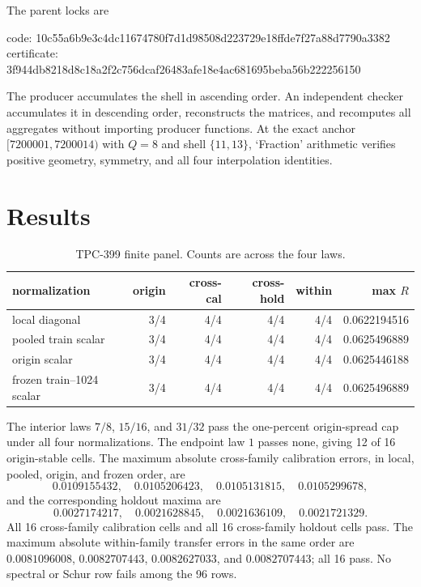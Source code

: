\documentclass[10pt]{article}
\begin{document}
The parent locks are
\begin{center}
\small\ttfamily
code: 10c55a6b9e3c4dc11674780f7d1d98508d223729e18ffde7f27a88d7790a3382\\
certificate: 3f944db8218d8c18a2f2c756dcaf26483afe18e4ac681695beba56b222256150
\end{center}

The producer accumulates the shell in ascending order.  An independent
checker accumulates it in descending order, reconstructs the matrices, and
recomputes all aggregates without importing producer functions.  At the exact
anchor $[7200001,7200014)$ with $Q=8$ and shell $\{11,13\}$, `Fraction'
arithmetic verifies positive geometry, symmetry, and all four interpolation
identities.

\section{Results}

\begin{table}[t]
\centering
\caption{TPC-399 finite panel.  Counts are across the four laws.}
\label{tab:summary}
\small
\begin{tabular}{@{}lrrrrr@{}}
\toprule
normalization & origin & cross-cal & cross-hold & within & max $R$\\
\midrule
local diagonal & 3/4 & 4/4 & 4/4 & 4/4 & 0.0622194516\\
pooled train scalar & 3/4 & 4/4 & 4/4 & 4/4 & 0.0625496889\\
origin scalar & 3/4 & 4/4 & 4/4 & 4/4 & 0.0625446188\\
frozen train--1024 scalar & 3/4 & 4/4 & 4/4 & 4/4 & 0.0625496889\\
\bottomrule
\end{tabular}
\end{table}

The interior laws $7/8$, $15/16$, and $31/32$ pass the one-percent
origin-spread cap under all four normalizations.  The endpoint law $1$ passes
none, giving 12 of 16 origin-stable cells.  The maximum absolute cross-family
calibration errors, in local, pooled, origin, and frozen order, are
\[
0.0109155432,\quad 0.0105206423,\quad
0.0105131815,\quad 0.0105299678,
\]
and the corresponding holdout maxima are
\[
0.0027174217,\quad 0.0021628845,\quad
0.0021636109,\quad 0.0021721329.
\]
All 16 cross-family calibration cells and all 16 cross-family holdout cells
pass.  The maximum absolute within-family transfer errors in the same order
are $0.0081096008$, $0.0082707443$, $0.0082627033$, and $0.0082707443$;
all 16 pass.  No spectral or Schur row fails among the 96 rows.
\end{document}
